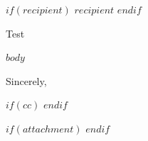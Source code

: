\documentclass[paper=letter, font=10pt, oneside, BCOR = 0pt]{scrlttr2}
\begin{document}
    \begin{letter}%
	$if(recipient)$
	{$recipient$}
	$endif$
	
	\opening{Test}

	$body$
	
	\closing{Sincerely,}
   
    $if(cc)$
    $endif$
        
    $if(attachment)$
    $endif$
    \end{letter}
\end{document}
